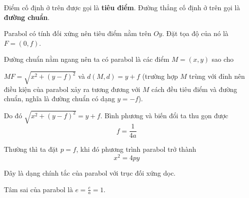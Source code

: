 Điểm cố định ở trên được gọi là \textbf{tiêu điểm}. Đường thẳng cố định ở trên gọi là \textbf{đường chuẩn}.

Parabol có tính đối xứng nên tiêu điểm nằm trên $Oy$. Đặt tọa độ của nó là $F = (0, f)$.

Đường chuẩn nằm ngang nên ta có parabol là các điểm $M = (x, y)$ sao cho

$MF = \sqrt{x^2 + (y-f)^2}$ và $d(M, d) = y+f$ 
(trường hợp $M$ trùng với đỉnh nên điều kiện của parabol xảy ra tương đương với $M$ cách đều tiêu điểm và đường chuẩn, nghĩa là đường chuẩn có dạng $y=-f$).

Do đó $\sqrt{x^2 + (y-f)^2} = y + f$. Bình phương và biến đổi ta thu gọn được
$$f = \frac{1}{4a}$$

Thường thì ta đặt $p = f$, khi đó phương trình parabol trở thành 
$$x^2 = 4py$$

Đây là dạng chính tắc của parabol với trục đối xứng dọc.

Tâm sai của parabol là $e = \frac{c}{a} = 1$.

\newpage

